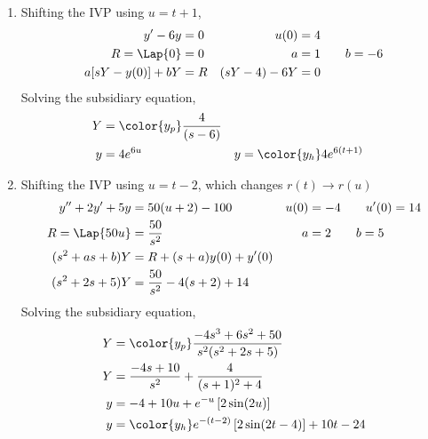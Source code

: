 \begin{enumerate}
    \item Shifting the IVP using $ u = t+1 $,
          \begin{align}
              y' - 6y           & = 0               &
              u(0)              & = 4                 \\
              R = \Lap\{0\}     & = 0               &
              a                 & = 1 \qquad b = -6   \\
              a[sY - y(0)] + bY & = R               &
              (sY - 4) - 6Y     & = 0
          \end{align}
          Solving the subsidiary equation,
          \begin{align}
              Y & = \color{y_p}\frac{4}{(s - 6)}   \\
              y & =  4e^{6u}                     &
              y & = \color{y_h} 4e^{6(t+1)}
          \end{align}


    \item Shifting the IVP using $ u = t-2 $, which changes $ r(t) \to r(u) $
          \begin{align}
              y'' + 2y' + 5y  & = 50(u+2) - 100                &
              u(0)            & = -4 \qquad u'(0) = 14           \\
              R = \Lap\{50u\} & = \frac{50}{s^2}               &
              a               & = 2 \qquad b = 5                 \\
              (s^2 + as + b)Y & = R + (s+a)y(0) + y'(0)          \\
              (s^2 + 2s + 5)Y & = \frac{50}{s^2} - 4(s+2) + 14
          \end{align}
          Solving the subsidiary equation,
          \begin{align}
              Y & = \color{y_p}\frac{-4s^3 + 6s^2 + 50}
              {s^2 (s^2 + 2s + 5)}                                   \\
              Y & = \frac{-4s + 10}{s^2}
              + \frac{4}{(s+1)^2 + 4}                                \\
              y & = -4 + 10u + e^{-u}\left[ 2\sin(2u) \right]        \\
              y & = \color{y_h} e^{-(t-2)}\left[ 2\sin(2t-4) \right]
              + 10t - 24
          \end{align}


\end{enumerate}
